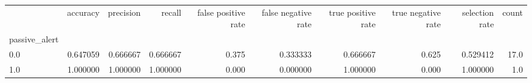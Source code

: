 \begin{tabular}{lrrrrrrrrr}
\toprule
{} &  accuracy &  precision &    recall &  false positive rate &  false negative rate &  true positive rate &  true negative rate &  selection rate &  count \\
passive\_alert &           &            &           &                      &                      &                     &                     &                 &        \\
\midrule
0.0           &  0.647059 &   0.666667 &  0.666667 &                0.375 &             0.333333 &            0.666667 &               0.625 &        0.529412 &   17.0 \\
1.0           &  1.000000 &   1.000000 &  1.000000 &                0.000 &             0.000000 &            1.000000 &               0.000 &        1.000000 &    1.0 \\
\bottomrule
\end{tabular}

